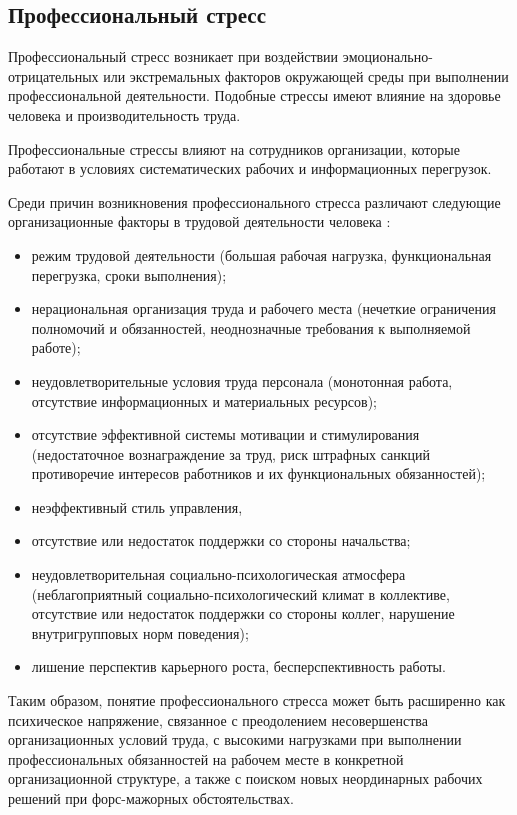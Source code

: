 \subsection{Профессиональный стресс}
Профессиональный стресс возникает при воздействии эмоционально-отрицательных или экстремальных факторов окружающей среды при выполнении профессиональной деятельности. Подобные стрессы имеют влияние на здоровье человека и производительность труда. \cite{professionalStress}

Профессиональные стрессы влияют на сотрудников организации, которые работают в условиях систематических рабочих и информационных перегрузок.

Среди причин возникновения профессионального стресса различают следующие организационные факторы в трудовой деятельности человека \cite{professionalStress}:
\begin{itemize}[leftmargin=1.6\parindent]
\item режим трудовой деятельности (большая рабочая нагрузка, функциональная перегрузка, сроки выполнения);
\item нерациональная организация труда и рабочего места (нечеткие ограничения полномочий и обязанностей, неоднозначные требования к выполняемой работе);
\item неудовлетворительные условия труда персонала (монотонная работа, отсутствие информационных и материальных ресурсов);
\item отсутствие эффективной системы мотивации и стимулирования (недостаточное вознаграждение за труд, риск штрафных санкций противоречие интересов работников и их функциональных обязанностей);
\item неэффективный стиль управления, 
\item отсутствие или недостаток поддержки со стороны начальства;
\item неудовлетворительная социально-психологическая атмосфера (неблагоприятный социально-психологический климат в коллективе, отсутствие или недостаток поддержки со стороны коллег, нарушение внутригрупповых норм поведения);
\item лишение перспектив карьерного роста, бесперспективность работы.
\end{itemize}

Таким образом, понятие профессионального стресса может быть расширенно как психическое напряжение, связанное с преодолением несовершенства организационных условий труда, с высокими нагрузками при выполнении профессиональных обязанностей на рабочем месте в конкретной организационной структуре, а также с поиском новых неординарных рабочих решений при форс-мажорных обстоятельствах. \cite{professionalStress}

